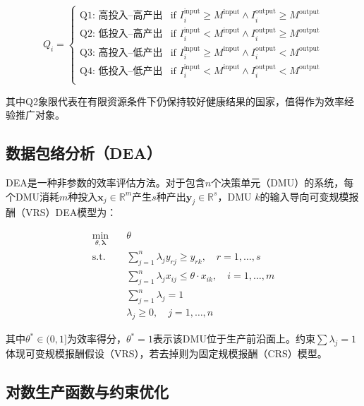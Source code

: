 \documentclass[12pt,a4paper]{ctexart}
\begin{document}
\begin{equation}
    Q_i = \begin{cases}
    \text{Q1: 高投入--高产出} & \text{if } I_i^{\text{input}} \geq M^{\text{input}} \land I_i^{\text{output}} \geq M^{\text{output}} \\
    \text{Q2: 低投入--高产出} & \text{if } I_i^{\text{input}} < M^{\text{input}} \land I_i^{\text{output}} \geq M^{\text{output}} \\
    \text{Q3: 高投入--低产出} & \text{if } I_i^{\text{input}} \geq M^{\text{input}} \land I_i^{\text{output}} < M^{\text{output}} \\
    \text{Q4: 低投入--低产出} & \text{if } I_i^{\text{input}} < M^{\text{input}} \land I_i^{\text{output}} < M^{\text{output}} \\
    \end{cases}
\end{equation}

其中Q2象限代表在有限资源条件下仍保持较好健康结果的国家，值得作为效率经验推广对象。

\subsection{数据包络分析（DEA）}

DEA是一种非参数的效率评估方法。对于包含$n$个决策单元（DMU）的系统，每个DMU消耗$m$种投入$\mathbf{x}_j \in \mathbb{R}^m$产生$s$种产出$\mathbf{y}_j \in \mathbb{R}^s$，DMU $k$的输入导向可变规模报酬（VRS）DEA模型为：

\begin{equation}
\label{eq:dea}
\begin{aligned}
\min_{\theta, \bm{\lambda}} \quad & \theta \\
\text{s.t.} \quad & \sum_{j=1}^{n} \lambda_j y_{rj} \geq y_{rk}, \quad r = 1, \ldots, s \\
& \sum_{j=1}^{n} \lambda_j x_{ij} \leq \theta \cdot x_{ik}, \quad i = 1, \ldots, m \\
& \sum_{j=1}^{n} \lambda_j = 1 \\
& \lambda_j \geq 0, \quad j = 1, \ldots, n
\end{aligned}
\end{equation}

其中$\theta^* \in (0, 1]$为效率得分，$\theta^* = 1$表示该DMU位于生产前沿面上。约束$\sum \lambda_j = 1$体现可变规模报酬假设（VRS），若去掉则为固定规模报酬（CRS）模型。

\subsection{对数生产函数与约束优化}
\end{document}
